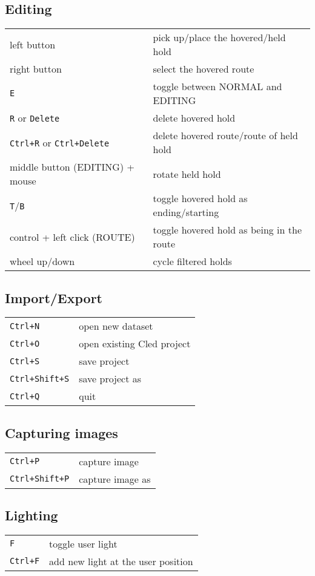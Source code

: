 \subsection{Editing}

\begin{tabular}[]{@{}ll@{}}
\toprule
left button & pick up/place the hovered/held hold \\
right button & select the hovered route \\
\verb|E| & toggle between NORMAL and EDITING \\
\verb|R| or \verb|Delete| & delete hovered hold \\
\verb|Ctrl+R| or \verb|Ctrl+Delete| & delete hovered route/route of held hold \\
middle button (EDITING) + mouse & rotate held hold \\
\verb|T|/\verb|B| & toggle hovered hold as ending/starting \\
control + left click (ROUTE) & toggle hovered hold as being in the
route \\
wheel up/down & cycle filtered holds \\
\bottomrule
\end{tabular}

\subsection{Import/Export}

\begin{tabular}[]{@{}ll@{}}
\toprule
\verb|Ctrl+N| & open new dataset \\
\verb|Ctrl+O| & open existing Cled project \\
\verb|Ctrl+S| & save project \\
\verb|Ctrl+Shift+S| & save project as \\
\verb|Ctrl+Q| & quit \\
\bottomrule
\end{tabular}

\subsection{Capturing images}

\begin{tabular}[]{@{}ll@{}}
\toprule
\verb|Ctrl+P| & capture image \\
\verb|Ctrl+Shift+P| & capture image as \\
\bottomrule
\end{tabular}

\subsection{Lighting}

\begin{tabular}[]{@{}ll@{}}
\toprule
\verb|F| & toggle user light \\
\verb|Ctrl+F| & add new light at the user position \\
\bottomrule
\end{tabular}

